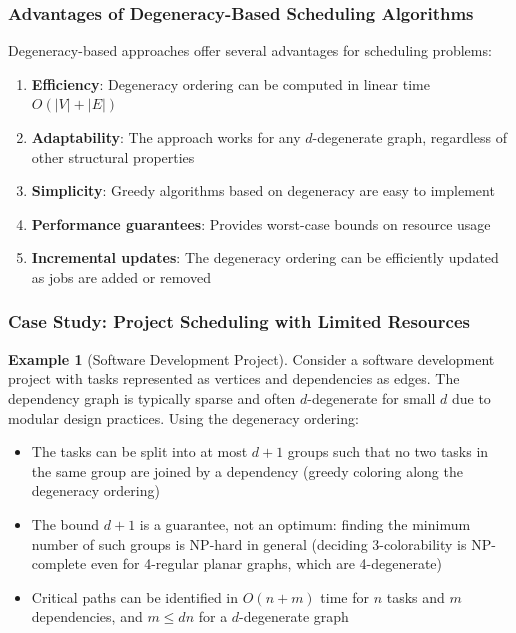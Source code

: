 \documentclass{article}
\theoremstyle{definition}
\newtheorem{example}{Example}
\begin{document}
\subsubsection*{Advantages of Degeneracy-Based Scheduling Algorithms}

Degeneracy-based approaches offer several advantages for scheduling problems:

\begin{enumerate}
    \item \textbf{Efficiency}: Degeneracy ordering can be computed in linear time $O(|V| + |E|)$
    \item \textbf{Adaptability}: The approach works for any $d$-degenerate graph, regardless of other structural properties
    \item \textbf{Simplicity}: Greedy algorithms based on degeneracy are easy to implement
    \item \textbf{Performance guarantees}: Provides worst-case bounds on resource usage
    \item \textbf{Incremental updates}: The degeneracy ordering can be efficiently updated as jobs are added or removed
\end{enumerate}

\subsubsection*{Case Study: Project Scheduling with Limited Resources}

\begin{example}[Software Development Project]
Consider a software development project with tasks represented as vertices and dependencies as edges. The dependency graph is typically sparse and often $d$-degenerate for small $d$ due to modular design practices. Using the degeneracy ordering:

\begin{itemize}
    \item The tasks can be split into at most $d+1$ groups such that no two tasks in the same group are joined by a dependency (greedy coloring along the degeneracy ordering)
    \item The bound $d+1$ is a guarantee, not an optimum: finding the minimum number of such groups is NP-hard in general (deciding 3-colorability is NP-complete even for 4-regular planar graphs, which are 4-degenerate)
    \item Critical paths can be identified in $O(n+m)$ time for $n$ tasks and $m$ dependencies, and $m \leq dn$ for a $d$-degenerate graph
\end{itemize}
\end{example}
\end{document}
